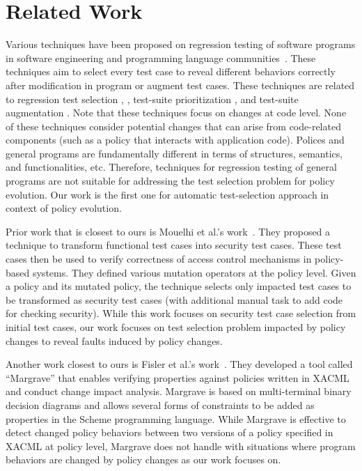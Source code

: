 \section{Related Work}
\label{sec:related}


Various techniques have been proposed on regression testing of software programs in software engineering and
programming language communities~\cite{Rothermel:1996:ART:235681.235682, Graves:2001:ESR:367008.367020, Elbaum:2000:PTC:347324.348910,santelices08sep}.
These techniques aim to select every test case to reveal different behaviors correctly after modification
in program or augment test cases.
These techniques are related to regression test selection \cite{Rothermel:1996:ART:235681.235682}, 
\cite{Graves:2001:ESR:367008.367020}, test-suite prioritization \cite{Elbaum:2000:PTC:347324.348910}, and test-suite augmentation \cite{santelices08sep}. 
Note that these techniques focus on changes at code level.
None of these techniques consider potential changes that can arise from code-related components (such as a policy that interacts with application code).
Polices and general programs are fundamentally different in terms of structures, semantics, and
functionalities, etc. Therefore, techniques for regression
testing of general programs are not suitable for addressing 
the test selection problem for policy evolution.
Our work is the first one for automatic test-selection approach in context of policy
evolution.

Prior work that is closest to ours is Mouelhi et al.'s
work~\cite{mouelhi09:tranforming}.
They proposed a technique to transform functional test cases into security test cases. 
These test cases then be used to verify correctness of access control mechanisms in policy-based systems.
They defined various mutation operators at the policy level.
Given a policy and its mutated policy, the technique selects only impacted test cases to be transformed as security test cases
(with additional manual task to add code for checking security).
While this work focuses on security test case selection from initial test cases,
our work focuses on test selection problem impacted by policy changes
to reveal faults induced by policy changes.

Another work closest to ours is Fisler et al.'s
work~\cite{fisler05:verification}.
They developed a tool called ``Margrave'' that enables verifying properties against 
policies written in XACML and conduct change impact analysis. Margrave is based on multi-terminal binary decision diagrams and allows several forms of 
constraints to be added as properties in the Scheme programming language.
While Margrave is effective to detect changed policy behaviors between two versions
of a policy specified in XACML at policy level, Margrave does not handle with situations where
program behaviors are changed by policy changes as our work focuses on.

